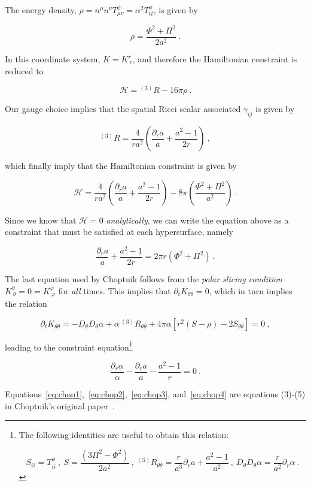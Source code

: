 \documentclass[a4paper,11pt]{article}
\renewcommand{\a}{\alpha}
\newcommand{\g}{\gamma}
\newcommand{\gDD}[2]{\g_{{#1}{#2}}}
\newcommand{\pd}{\partial}
\newcommand{\nn}{\nonumber}
\renewcommand{\H}{\mathcal{H}}
\newcommand{\lrpar}[1]{\left( #1 \right)}
\newcommand{\lrsquare}[1]{\left[ #1 \right]}
\newcommand{\n}{\noindent}
\newcommand{\eq}[1]{
  \begin{equation}
    #1
  \end{equation}
}
\begin{document}
\n The energy density, $\rho = n^{\mu}n^{\nu}T^{\phi}_{\mu\nu} = \alpha^{2}T^{\phi}_{tt}$, is given by

\eq{ \rho = \frac{\Phi^{2} + \Pi^{2}}{2a^{2}}\ .}

In this coordinate system, $K = K^{r}_{\ r}$, and therefore the Hamiltonian constraint is reduced to

\eq{ \H = {}^{(3)}\!R - 16\pi\rho\ . }

\n Our gauge choice implies that the spatial Ricci scalar associated $\gDD{i}{j}$ is given by

\eq{ ^{(3)}\!R = \frac{4}{ra^{2}}\lrpar{\frac{\pd_{r}a}{a} + \frac{a^{2}-1}{2r}}\ ,}

\n which finally imply that the Hamiltonian constraint is given by

\eq{ \H = \frac{4}{ra^{2}}\lrpar{\frac{\pd_{r}a}{a} + \frac{a^{2}-1}{2r}} - 8\pi\lrpar{\frac{\Phi^{2} + \Pi^{2}}{a^{2}}} \ .}

\n Since we know that $\H=0$ \emph{analytically}, we can write the equation above as a constraint that must be satisfied at each hypersurface, namely

\eq{ \frac{\pd_{r}a}{a} + \frac{a^{2}-1}{2r} = 2\pi r\lrpar{\Phi^{2} + \Pi^{2}}\ . \label{eq:chop3} }

The last equation used by Choptuik follows from the \emph{polar slicing condition} $K^{\theta}_{\ \theta} = 0 = K^{\varphi}_{\ \varphi}$ for \emph{all} times. This implies that $\pd_{t}K_{\theta\theta} = 0$, which in turn implies the relation

\eq{ \pd_{t}K_{\theta\theta} = -D_{\theta}D_{\theta}\a + \a\, ^{(3)}\!R_{\theta\theta} + 4\pi\a\lrsquare{r^{2}\lrpar{S-\rho} - 2S_{\theta\theta}} = 0\ ,}

\n leading to the constraint equation\footnote{The following identities are useful to obtain this relation:

  \eq{
    S_{ii} = T^{\phi}_{ii}\ ,\ S = \frac{\lrpar{3\Pi^{2} - \Phi^{2}}}{2a^{2}}\ ,\ {}^{(3)}\!R_{\theta\theta} = \frac{r}{a^{3}}\pd_{r}a + \frac{a^{2}-1}{a^{2}}\ ,\ D_{\theta}D_{\theta}\a = \frac{r}{a^{2}}\pd_{r}\a\ .\nn
  }
}

\eq{ \frac{\pd_{r}\a}{\a} - \frac{\pd_{r}a}{a} - \frac{a^{2}-1}{r} = 0\ . \label{eq:chop4}}

Equations~\eqref{eq:chop1},~\eqref{eq:chop2},~\eqref{eq:chop3}, and~\eqref{eq:chop4} are equations (3)-(5) in Choptuik's original paper~\cite{PhysRevLett.70.9}.
\end{document}
